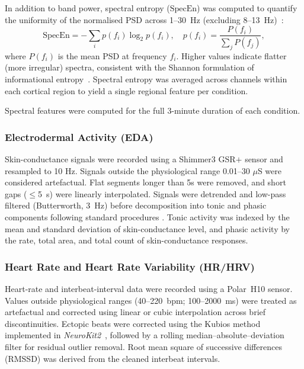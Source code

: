 \documentclass[lettersize,journal]{IEEEtran}
\begin{document}
In addition to band power, spectral entropy (\( \mathrm{SpecEn} \)) was computed to quantify the uniformity of the normalised PSD across 1--30~Hz (excluding 8--13~Hz)~\cite{inouyeQuantificationEEGIrregularity1991}:
\begin{equation}
\mathrm{SpecEn} = -\sum_i p(f_i)\log_2 p(f_i), \quad 
p(f_i)=\frac{P(f_i)}{\sum_j P(f_j)} ,
\end{equation}
where \(P(f_i)\) is the mean PSD at frequency \(f_i\). Higher values indicate flatter (more irregular) spectra, consistent with the Shannon formulation of informational entropy~\cite{shannonMathematicalTheoryCommunication}. Spectral entropy was averaged across channels within each cortical region to yield a single regional feature per condition.

Spectral features were computed for the full 3-minute duration of each condition.


\subsubsection{Electrodermal Activity (EDA)}
Skin-conductance signals were recorded using a Shimmer3 GSR$+$ sensor and resampled to 10 Hz. Signals outside the physiological range 0.01–30 $\mu$S were considered artefactual. Flat segments longer than 5s were removed, and short gaps ($\leq$5~s) were linearly interpolated. Signals were detrended and low-pass filtered (Butterworth, 3~Hz) before decomposition into tonic and phasic components following standard procedures \cite{makowskiNeuroKit2PythonToolbox2021}. Tonic activity was indexed by the mean and standard deviation of skin-conductance level, and phasic activity by the rate, total area, and total count of skin-conductance responses.

\subsubsection{Heart Rate and Heart Rate Variability (HR/HRV)}
Heart-rate and interbeat-interval data were recorded using a Polar~H10 sensor. Values outside physiological ranges (40--220~bpm; 100--2000~ms) were treated as artefactual and corrected using linear or cubic interpolation across brief discontinuities. Ectopic beats were corrected using the Kubios method~\cite{lipponenRobustAlgorithmHeart2019} implemented in \textit{NeuroKit2}~\cite{makowskiNeuroKit2PythonToolbox2021}, followed by a rolling median--absolute--deviation filter for residual outlier removal. Root mean square of successive differences (RMSSD) was derived from the cleaned interbeat intervals.
\end{document}
